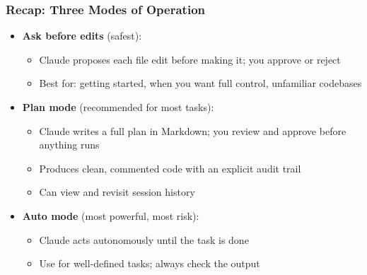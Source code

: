 \documentclass[aspectratio=169, 12pt]{beamer}
\begin{document}
\begin{frame}
\frametitle{Recap: Three Modes of Operation}

\begin{itemize}
    \item \textbf{Ask before edits} (safest):
        \begin{itemize}
            \item[$\circ$] Claude proposes each file edit before making it; you approve or reject
            \item[$\circ$] Best for: getting started, when you want full control, unfamiliar codebases
        \end{itemize}
    \vspace{.05in}
    \item \textbf{Plan mode} (recommended for most tasks):
        \begin{itemize}
            \item[$\circ$] Claude writes a full plan in Markdown; you review and approve before anything runs
            \item[$\circ$] Produces clean, commented code with an explicit audit trail
            \item[$\circ$] Can view and revisit session history
        \end{itemize}
    \vspace{.05in}
    \item \textbf{Auto mode} (most powerful, most risk):
        \begin{itemize}
            \item[$\circ$] Claude acts autonomously until the task is done
            \item[$\circ$] Use for well-defined tasks; always check the output
        \end{itemize}
\end{itemize}

\end{frame}
\end{document}
